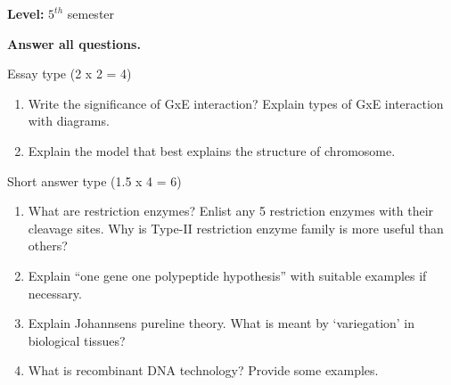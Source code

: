 \documentclass[10pt,]{article}
\providecommand{\tightlist}{%
  \setlength{\itemsep}{0pt}\setlength{\parskip}{0pt}}
\begin{document}
\par
\endgroup

\begingroup

\hspace{0.5\textwidth}

\par
\endgroup

\textbf{Level:} \(5^{th}\) semester

\textbf{Answer all questions.}

Essay type (2 x 2 = 4)

\begin{enumerate}
\def\labelenumi{\arabic{enumi}.}
\tightlist
\item
  Write the significance of GxE interaction? Explain types of GxE interaction with diagrams.
\item
  Explain the model that best explains the structure of chromosome.
\end{enumerate}

Short answer type (1.5 x 4 = 6)

\begin{enumerate}
\def\labelenumi{\arabic{enumi}.}
\tightlist
\item
  What are restriction enzymes? Enlist any 5 restriction enzymes with their cleavage sites. Why is Type-II restriction enzyme family is more useful than others?
\item
  Explain ``one gene one polypeptide hypothesis'' with suitable examples if necessary.
\item
  Explain Johannsens pureline theory. What is meant by `variegation' in biological tissues?
\item
  What is recombinant DNA technology? Provide some examples.
\end{enumerate}
\end{document}
